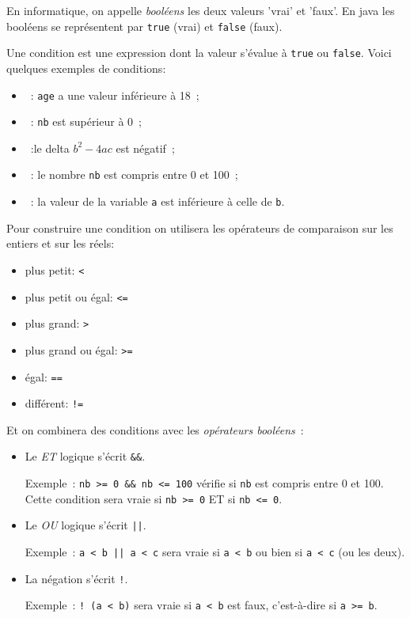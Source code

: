 \documentclass[a4paper,11pt]{article}
\begin{document}
	En informatique, on appelle \emph{booléens} les deux valeurs 'vrai' et 'faux'. 
	En java les booléens se représentent par \texttt{true} (vrai) et \texttt{false} (faux).  

	Une condition est une expression dont la valeur s'évalue à \texttt{true} ou \texttt{false}.
	Voici quelques exemples de conditions:
	\begin{itemize}
		\item {}~:   \texttt{age} a une valeur inférieure à 18~;
		\item {}~:  \texttt{nb} est supérieur à 0~;
		\item {}~:le delta $b^2-4ac$ est négatif~;
		\item {}~: le nombre \texttt{nb} est compris entre 0 et 100~;
		\item {}~:  la valeur de la variable \texttt{a} est inférieure à celle de \texttt{b}.
	\end{itemize}


	Pour construire une condition on utilisera les opérateurs de comparaison sur les entiers et sur les réels:
	
	\begin{itemize}
		\item plus petit: \texttt{<}
		\item plus petit ou égal: \texttt{<=}
		\item plus grand: \texttt{>}
		\item plus grand ou égal: \texttt{>=}
		\item  égal: \texttt{==}
		\item  différent: \texttt{!=}
	\end{itemize} 

	Et on combinera des conditions avec les \emph{opérateurs booléens}~:
	\begin{itemize}
		\item Le \emph{ET} logique s'écrit \texttt{\&\&}.
			
			Exemple~: \texttt{nb >= 0 \&\& nb <= 100} vérifie si \texttt{nb} est compris entre 0 et 100.
			Cette condition sera vraie si \texttt{nb >= 0} ET si \texttt{nb <= 0}. 
			
		\item Le \emph{OU} logique s'écrit \texttt{||}. 
			
			Exemple~: \texttt{a < b || a < c} sera vraie si \texttt{a < b} ou bien si \texttt{a < c} (ou les deux).
			
		\item La négation s'écrit \texttt{!}. 
		
			Exemple~: \texttt{! (a < b)} sera vraie si \texttt{a < b} est faux, c'est-à-dire si \texttt{a >= b}.
	\end{itemize}
	
\end{document}
